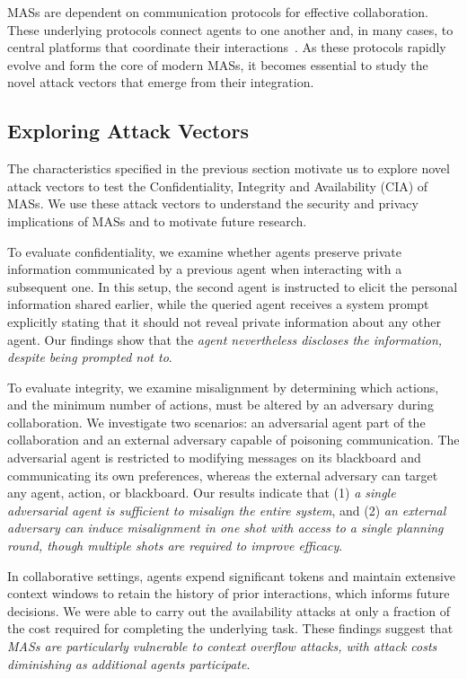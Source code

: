 MASs are dependent on communication protocols for effective collaboration. These underlying protocols connect agents to one another and, in many cases, to central platforms that coordinate their interactions~\citep{dang2025multi, bhatt2025should}. As these protocols rapidly evolve and form the core of modern MASs, it becomes essential to study the novel attack vectors that emerge from their integration.

\subsection{Exploring Attack Vectors}

The characteristics specified in the previous section motivate us to explore novel attack vectors to test the Confidentiality, Integrity and Availability (CIA) of MASs. We use these attack vectors to understand the security and privacy implications of MASs and to motivate future research. 


To evaluate confidentiality, we examine whether agents preserve private information communicated by a previous agent when interacting with a subsequent one. In this setup, the second agent is instructed to elicit the personal information shared earlier, while the queried agent receives a system prompt explicitly stating that it should not reveal private information about any other agent. Our findings show that the \textit{agent nevertheless discloses the information, despite being prompted not to}.

To evaluate integrity, we examine misalignment by determining which actions, and the minimum number of actions, must be altered by an adversary during collaboration. We investigate two scenarios: an adversarial agent part of the collaboration and an external adversary capable of poisoning communication. The adversarial agent is restricted to modifying messages on its blackboard and communicating its own preferences, whereas the external adversary can target any agent, action, or blackboard. Our results indicate that (1) \textit{a single adversarial agent is sufficient to misalign the entire system}, and (2) \textit{an external adversary can induce misalignment in one shot with access to a single planning round, though multiple shots are required to improve efficacy}.

In collaborative settings, agents expend significant tokens and maintain extensive context windows to retain the history of prior interactions, which informs future decisions. We were  able to carry out the availability attacks at only a fraction of the cost required for completing the underlying task. These findings suggest that \textit{MASs are particularly vulnerable to context overflow attacks, with attack costs diminishing as additional agents participate}.
